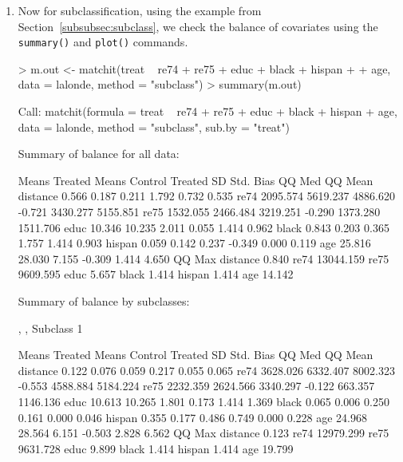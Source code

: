 \documentclass[oneside,letterpaper,titlepage]{article}
\begin{document}
\begin{enumerate}
\item Now for subclassification, using the example from
  Section~\ref{subsubsec:subclass}, we check the balance of
  covariates using the \texttt{summary()} and \texttt{plot()} commands.
\begin{Schunk}
\begin{Sinput}
> m.out <- matchit(treat ~ re74 + re75 + educ + black + hispan + 
+     age, data = lalonde, method = "subclass")
> summary(m.out)
\end{Sinput}
\begin{Soutput}
Call:
matchit(formula = treat ~ re74 + re75 + educ + black + hispan +     age, data = lalonde, method = "subclass", sub.by = "treat")

Summary of balance for all data:

         Means Treated Means Control Treated SD Std. Bias   QQ Med  QQ Mean
distance         0.566         0.187      0.211     1.792    0.732    0.535
re74          2095.574      5619.237   4886.620    -0.721 3430.277 5155.851
re75          1532.055      2466.484   3219.251    -0.290 1373.280 1511.706
educ            10.346        10.235      2.011     0.055    1.414    0.962
black            0.843         0.203      0.365     1.757    1.414    0.903
hispan           0.059         0.142      0.237    -0.349    0.000    0.119
age             25.816        28.030      7.155    -0.309    1.414    4.650
            QQ Max
distance     0.840
re74     13044.159
re75      9609.595
educ         5.657
black        1.414
hispan       1.414
age         14.142


Summary of balance by subclasses:

, , Subclass 1

         Means Treated Means Control Treated SD Std. Bias    QQ Med   QQ Mean
distance         0.122         0.076      0.059     0.217     0.055     0.065
re74          3628.026      6332.407   8002.323    -0.553  4588.884  5184.224
re75          2232.359      2624.566   3340.297    -0.122   663.357  1146.136
educ            10.613        10.265      1.801     0.173     1.414     1.369
black            0.065         0.006      0.250     0.161     0.000     0.046
hispan           0.355         0.177      0.486     0.749     0.000     0.228
age             24.968        28.564      6.151    -0.503     2.828     6.562
            QQ Max
distance     0.123
re74     12979.299
re75      9631.728
educ         9.899
black        1.414
hispan       1.414
age         19.799


\end{Soutput}
\end{Schunk}
\end{enumerate}
\end{document}

